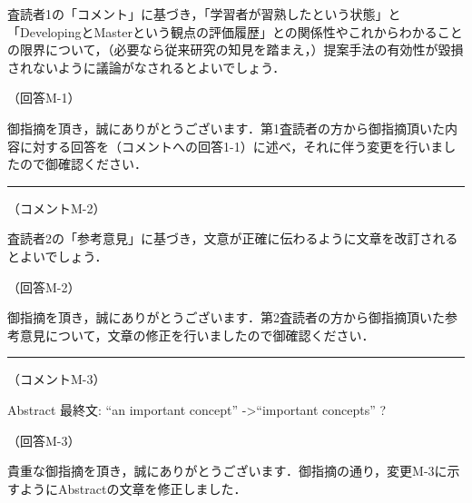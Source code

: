\documentclass{jarticle} %
\def\subsection#1{ \vspace{1pc} {\gt #1} }
\def\nextans{ \vspace{2pc} \hrule }
\begin{document}
査読者1の「コメント」に基づき，「学習者が習熟したという状態」と「DevelopingとMasterという観点の評価履歴」との関係性やこれからわかることの限界について，（必要なら従来研究の知見を踏まえ，）提案手法の有効性が毀損されないように議論がなされるとよいでしょう．

\subsection{（回答M-1）}

御指摘を頂き，誠にありがとうございます．第1査読者の方から御指摘頂いた内容に対する回答を（コメントへの回答1-1）に述べ，それに伴う変更を行いましたので御確認ください．

\newpage
\nextans
\subsection{（コメントM-2）}

査読者2の「参考意見」に基づき，文意が正確に伝わるように文章を改訂されるとよいでしょう．

\subsection{（回答M-2）}

御指摘を頂き，誠にありがとうございます．第2査読者の方から御指摘頂いた参考意見について，文章の修正を行いましたので御確認ください．

\nextans
\subsection{（コメントM-3）}

Abstract 最終文: ``an important concept'' -\textgreater ``important concepts'' ?

\subsection{（回答M-3）}

貴重な御指摘を頂き，誠にありがとうございます．御指摘の通り，変更M-3に示すようにAbstractの文章を修正しました．
\end{document}
